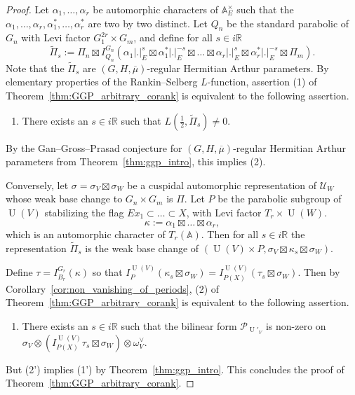 \documentclass[letterpaper,11pt]{amsart}
\newcommand{\bA}{\mathbb{A}}
\newcommand{\R}{\mathbb{R}}
\newcommand{\cP}{\mathcal{P}}
\newcommand{\cU}{\mathcal{U}}
\newcommand{\<}{\negthickspace}
\newcommand{\valP}[1]{\left|#1\right|}
\DeclareMathOperator{\U}{U}
\theoremstyle{definition}
\theoremstyle{plain}
\theoremstyle{remark}
\numberwithin{equation}{section}
\begin{document}
\begin{proof}
    Let $\alpha_1, \hdots, \alpha_r$ be automorphic characters of $\bA_E^\times$ such that the $\alpha_1, \hdots, \alpha_r, \alpha_1^*, \hdots, \alpha_r^*$ are two by two distinct. Let $Q_n$ be the standard parabolic of $G_n$ with Levi factor $G_1^{2r} \times G_m$, and define for all $s \in i \R$
    \begin{equation*}
        \widetilde{\Pi}_s:= \Pi_n \boxtimes I_{Q_n}^{G_n}( \alpha_1\valP{.}^s_E \boxtimes \alpha_1^*\valP{.}^{-s}_E \boxtimes \hdots \boxtimes \alpha_r\valP{.}^s_E \boxtimes \alpha_r^*\valP{.}^{-s}_E \boxtimes \Pi_m ).
    \end{equation*}
    Note that the $\widetilde{\Pi}_s$ are $(G,H,\overline{\mu})$-regular Hermitian Arthur parameters. By elementary properties of the Rankin--Selberg $L$-function, assertion (1) of Theorem~\ref{thm:GGP_arbitrary_corank} is equivalent to the following assertion.
    \begin{enumerate}
        \item[(1')] There exists an $s \in i\R$ such that $L(\frac{1}{2},\widetilde{\Pi}_s) \neq 0$. 
    \end{enumerate}
    By the Gan--Gross--Prasad conjecture for $(G,H,\overline{\mu})$-regular Hermitian Arthur parameters from Theorem~\ref{thm:ggp_intro}, this implies (2). 
    
    Conversely, let $\sigma=\sigma_V \boxtimes \sigma_W$ be a cuspidal automorphic representation of $\cU_W$ whose weak base change to $G_n \times G_m$ is $\Pi$. Let $P$ be the parabolic subgroup of $\U(V)$ stabilizing the flag $E x_1 \subset \hdots \subset X$, with Levi factor $T_r \times \U(W)$. 
    \begin{equation}
        \label{eq:kappa_defi}
    \kappa:=\alpha_1 \boxtimes \hdots \boxtimes \alpha_r,
    \end{equation}
    which is an automorphic character of $T_r(\bA)$.
    Then for all $s \in i \R$ the representation $\widetilde{\Pi}_s$ is the weak base change of $(\U(V) \times P,  \sigma_V \boxtimes \kappa_s \boxtimes \sigma_W)$.
    
    Define $\tau=I_{B_r}^{G_r}(\kappa)$ so that $I_P^{\U(V)}(\kappa_s \boxtimes \sigma_W)=I_{P(X)}^{\U(V)} (\tau_s \boxtimes \sigma_W)$. Then by Corollary~\ref{cor:non_vanishing_of_periods}, (2) of Theorem~\ref{thm:GGP_arbitrary_corank} is equivalent to the following assertion.
    \begin{enumerate}
        \item[(2')] There exists an $s \in i \R$ such that the bilinear form $\cP_{\U'_V}$ is non-zero on $\sigma_V \otimes (I_{P(X)}^{\U(V)} \tau_s \boxtimes \sigma_W) \otimes \omega^\vee_{V}$.
    \end{enumerate}
    But (2') implies (1') by Theorem~\ref{thm:ggp_intro}. This concludes the proof of Theorem~\ref{thm:GGP_arbitrary_corank}.

\end{proof}
\end{document}
